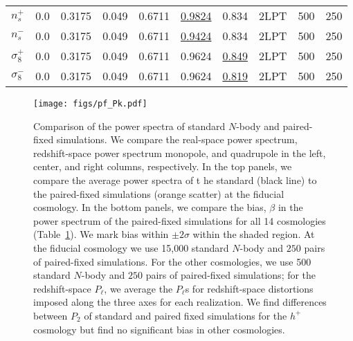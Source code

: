 \documentclass[12pt, letterpaper, preprint]{aastex62}
\begin{document}
\begin{table}
\begin{center}
\begin{tabular}{cccccccccc}
    $n_s^+$         & 0.0   & 0.3175 & 0.049 & 0.6711 & \underline{0.9824} & 0.834 & 2LPT & 500 & 250\\ 
    $n_s^-$         & 0.0   & 0.3175 & 0.049 & 0.6711 & \underline{0.9424} & 0.834 & 2LPT & 500 & 250\\ 
    $\sigma_8^+$    & 0.0   & 0.3175 & 0.049 & 0.6711 & 0.9624 & \underline{0.849} & 2LPT & 500 & 250\\ 
    $\sigma_8^-$    & 0.0   & 0.3175 & 0.049 & 0.6711 & 0.9624 & \underline{0.819} & 2LPT & 500 & 250\\[3pt]
    \hline
    \end{tabular} \label{tab:sims}
    \end{center}
\end{table}


\begin{figure}
\begin{center}
    \texttt{[image: figs/pf\_Pk.pdf]} 
    \caption{Comparison of the power spectra of standard $N$-body and paired-fixed
    simulations. We compare the real-space power spectrum, redshift-space power 
    spectrum monopole, and quadrupole in the left, center, and right columns, 
    respectively. In the top panels, we compare the average power spectra of t
    he standard (black line) to the paired-fixed simulations (orange scatter) 
    at the fiducial cosmology. In the bottom panels, we compare the bias, $\beta$ 
    in the power spectrum of the paired-fixed simulations for all 14 cosmologies 
    (Table~\ref{tab:sims}). We mark bias within $\pm2\sigma$ within the shaded 
    region. At the fiducial cosmology we use 15,000 standard $N$-body and $250$ 
    pairs of paired-fixed simulations. For the other cosmologies, we use 500 
    standard $N$-body and $250$ pairs of paired-fixed simulations; for the 
    redshift-space $P_\ell$, we average the $P_\ell$s for redshift-space distortions
    imposed along the three axes for each realization. We find differences between
    $P_2$ of  standard and paired fixed simulations for the $h^+$ cosmology but
    find no significant bias in other cosmologies.  
    }
\label{fig:pk}
\end{center}
\end{figure}
\end{document}
